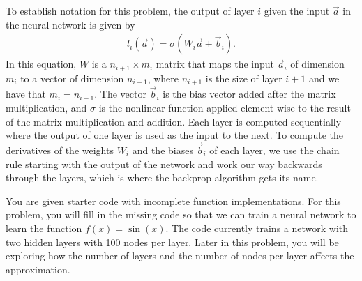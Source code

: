 To establish notation for this problem, the output of layer $i$ given the input $\vec{a}$ in the neural network is given by
\begin{align*}
l_i(\vec{a}) = \sigma(W_i\vec{a}+\vec{b}_i).
\end{align*}
In this equation, $W$ is a $n_{i+1}\times m_i$ matrix that maps the input $\vec a_i$ of dimension $m_i$ to a vector of dimension $n_{i+1}$, where $n_{i+1}$ is the size of layer $i+1$ and we have that $m_i=n_{i-1}$.  The vector $\vec{b}_i$ is the bias vector added after the matrix multiplication, and $\sigma$ is the nonlinear function applied element-wise to the result of the matrix multiplication and addition.  Each layer is computed sequentially where the output of one layer is used as the input to the next.  To compute the derivatives of the weights $W_i$ and the biases $\vec{b}_i$ of each layer, we use the chain rule starting with the output of the network and work our way backwards through the layers, which is where the backprop algorithm gets its name.

You are given starter code with incomplete function implementations.  For this problem, you will fill in the missing code so that we can train a neural network to learn the function $f(x) = \sin(x)$.  The code currently trains a network with two hidden layers with 100 nodes per layer.  Later in this problem, you will be exploring how the number of layers and the number of nodes per layer affects the approximation.

